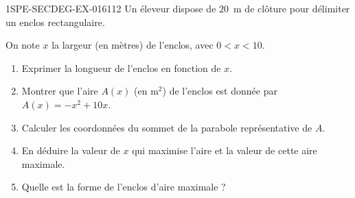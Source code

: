 \begin{exercice}{1SPE-SECDEG-EX-016}{1}{12}
Un éleveur dispose de $20$~m de clôture pour délimiter un enclos rectangulaire.

On note $x$ la largeur (en mètres) de l'enclos, avec $0 < x < 10$.

\begin{enumerate}
  \item Exprimer la longueur de l'enclos en fonction de $x$.
  \item Montrer que l'aire $A(x)$ (en m$^2$) de l'enclos est donnée par $A(x) = -x^2 + 10x$.
  \item Calculer les coordonnées du sommet de la parabole représentative de $A$.
  \item En déduire la valeur de $x$ qui maximise l'aire et la valeur de cette aire maximale.
  \item Quelle est la forme de l'enclos d'aire maximale ?
\end{enumerate}
\end{exercice}
